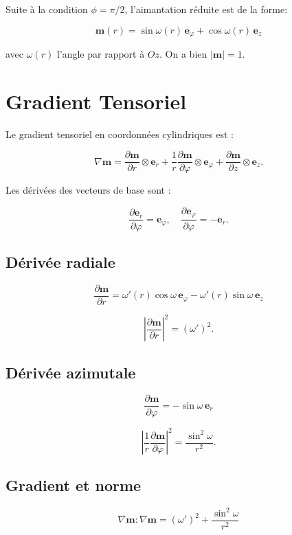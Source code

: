\documentclass[11pt,a4paper]{article}
\begin{document}
Suite à la condition $\phi = \pi/2$, l'aimantation réduite est de la forme:

\[
\mathbf m(r)
=
\sin\omega(r)\,\mathbf e_\varphi
+
\cos\omega(r)\,\mathbf e_z
\]

avec $\omega(r)$ l'angle par rapport à $Oz$. On a bien $|\mathbf m|=1$.


\section{Gradient Tensoriel}

Le gradient tensoriel en coordonnées cylindriques est :

\[
\nabla\mathbf m
=
\frac{\partial\mathbf m}{\partial r}\otimes\mathbf e_r
+
\frac1r\frac{\partial\mathbf m}{\partial\varphi}\otimes\mathbf e_\varphi
+
\frac{\partial\mathbf m}{\partial z}\otimes\mathbf e_z.
\]

Les dérivées des vecteurs de base sont :

\[
\frac{\partial\mathbf e_r}{\partial\varphi}=\mathbf e_\varphi,\quad
\frac{\partial\mathbf e_\varphi}{\partial\varphi}=-\mathbf e_r.
\]

\subsection{Dérivée radiale}

\[
\frac{\partial\mathbf m}{\partial r}
=
\omega'(r)\cos\omega\,\mathbf e_\varphi
-
\omega'(r)\sin\omega\,\mathbf e_z
\]

\[
\left|\frac{\partial\mathbf m}{\partial r}\right|^2=(\omega')^2.
\]

\subsection{Dérivée azimutale}

\[
\frac{\partial\mathbf m}{\partial\varphi}
=
-\sin\omega\,\mathbf e_r
\]

\[
\left|\frac1r\frac{\partial\mathbf m}{\partial\varphi}\right|^2
=
\frac{\sin^2\omega}{r^2}.
\]

\subsection{Gradient et norme}

\[
\boxed{
\nabla\mathbf m:\nabla\mathbf m
=
(\omega')^2+\frac{\sin^2\omega}{r^2}
}
\]
\end{document}
